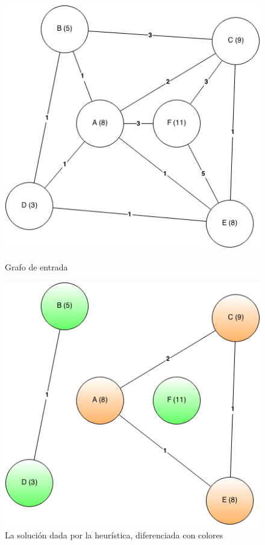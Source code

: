\begin{figure}[H]
	\begin{minipage}[t]{0.5\linewidth}
		\centering
		\includegraphics[width=\textwidth]{ejercicio-3-ejemplo-entrada.png}
		\caption{Grafo de entrada}
		\label{fig:ej3_ejemplo}
	\end{minipage}
	\begin{minipage}[t]{0.5\linewidth}
		\centering
		\includegraphics[width=\textwidth]{ejercicio-3-ejemplo-salida.png}
		\caption{La solución dada por la heurística, diferenciada con colores}
		\label{fig:ej3_ejemplo_solucion}
	\end{minipage}
\end{figure}

